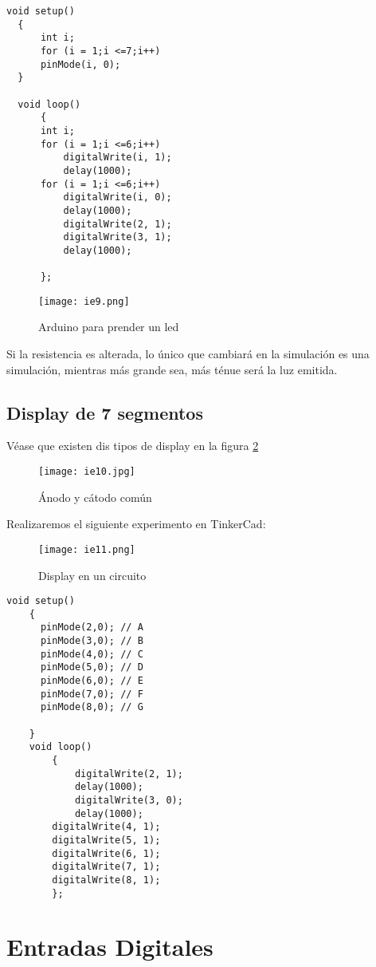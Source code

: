\begin{lstlisting}[style=pythonFrameTB]
  void setup()
  {
      int i;
      for (i = 1;i <=7;i++)
      pinMode(i, 0);
  }
  
  void loop()
      {
      int i;
      for (i = 1;i <=6;i++)
          digitalWrite(i, 1);
          delay(1000);
      for (i = 1;i <=6;i++)
          digitalWrite(i, 0);
          delay(1000);
          digitalWrite(2, 1);
          digitalWrite(3, 1);
          delay(1000);
          
      };
\end{lstlisting}
\begin{figure}[h!]
\centering
  \texttt{[image: ie9.png]}
  \caption{Arduino para prender un led}
  \label{ie9}
\end{figure}
Si la resistencia es alterada, lo único que cambiará en la simulación es una simulación, mientras más grande sea, más ténue será la luz emitida.
\subsection{Display de 7 segmentos}
Véase que existen dis tipos de display en la figura \ref{ie10}
\begin{figure}[h!]
\centering
  \texttt{[image: ie10.jpg]}
  \caption{Ánodo y cátodo común}
  \label{ie10}
\end{figure}
Realizaremos el siguiente experimento en TinkerCad:
\begin{figure}[h!]
\centering
  \texttt{[image: ie11.png]}
  \caption{Display en un circuito}
  \label{ie11}
\end{figure}
\begin{lstlisting}[style=pythonFrameTB]
    void setup()
    {
      pinMode(2,0); // A
      pinMode(3,0); // B
      pinMode(4,0); // C
      pinMode(5,0); // D
      pinMode(6,0); // E
      pinMode(7,0); // F
      pinMode(8,0); // G
      
    }
    void loop()
        {
            digitalWrite(2, 1);
            delay(1000);
            digitalWrite(3, 0);
            delay(1000);
        digitalWrite(4, 1);
        digitalWrite(5, 1);
        digitalWrite(6, 1);
        digitalWrite(7, 1);
        digitalWrite(8, 1);
        };
  \end{lstlisting}
  \section{Entradas Digitales}

